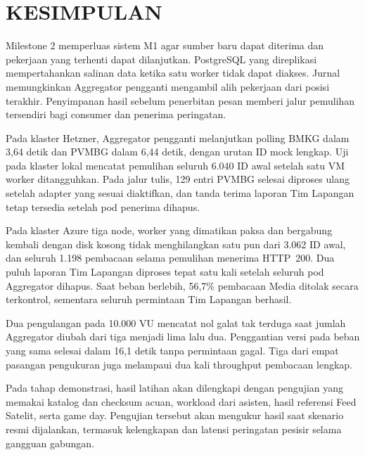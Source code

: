 \chapter{KESIMPULAN}

Milestone 2 memperluas sistem M1 agar sumber baru dapat diterima dan pekerjaan yang terhenti dapat dilanjutkan. PostgreSQL yang direplikasi mempertahankan salinan data ketika satu worker tidak dapat diakses. Jurnal memungkinkan Aggregator pengganti mengambil alih pekerjaan dari posisi terakhir. Penyimpanan hasil sebelum penerbitan pesan memberi jalur pemulihan tersendiri bagi consumer dan penerima peringatan.

Pada klaster Hetzner, Aggregator pengganti melanjutkan polling BMKG dalam 3{,}64 detik dan PVMBG dalam 6{,}44 detik, dengan urutan ID mock lengkap. Uji pada klaster lokal mencatat pemulihan seluruh 6.040 ID awal setelah satu VM worker ditangguhkan. Pada jalur tulis, 129 entri PVMBG selesai diproses ulang setelah adapter yang sesuai diaktifkan, dan tanda terima laporan Tim Lapangan tetap tersedia setelah pod penerima dihapus.

Pada klaster Azure tiga node, worker yang dimatikan paksa dan bergabung kembali dengan disk kosong tidak menghilangkan satu pun dari 3.062 ID awal, dan seluruh 1.198 pembacaan selama pemulihan menerima HTTP~200. Dua puluh laporan Tim Lapangan diproses tepat satu kali setelah seluruh pod Aggregator dihapus. Saat beban berlebih, 56{,}7\% pembacaan Media ditolak secara terkontrol, sementara seluruh permintaan Tim Lapangan berhasil.

Dua pengulangan pada 10.000 VU mencatat nol galat tak terduga saat jumlah Aggregator diubah dari tiga menjadi lima lalu dua. Penggantian versi pada beban yang sama selesai dalam 16{,}1 detik tanpa permintaan gagal. Tiga dari empat pasangan pengukuran juga melampaui dua kali throughput pembacaan lengkap.

Pada tahap demonstrasi, hasil latihan akan dilengkapi dengan pengujian yang memakai katalog dan checksum acuan, workload dari asisten, hasil referensi Feed Satelit, serta game day. Pengujian tersebut akan mengukur hasil saat skenario resmi dijalankan, termasuk kelengkapan dan latensi peringatan pesisir selama gangguan gabungan.
